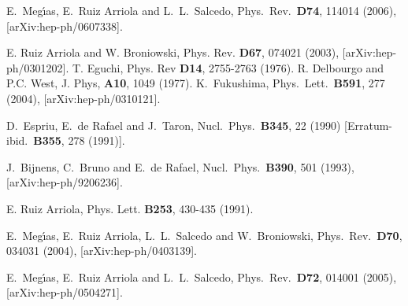 \begin{thebibliography}{10}

  E.~Meg\'{\i}as, E.~Ruiz Arriola and L.~L.~Salcedo,
  Phys.\ Rev.\  {\bf D74}, 114014 (2006),
  [arXiv:hep-ph/0607338].




E. Ruiz Arriola and W. Broniowski, Phys. Rev. {\bf D67}, 074021 (2003), [arXiv:hep-ph/0301202].
T. Eguchi, Phys. Rev {\bf D14}, 2755-2763 (1976).
R. Delbourgo and P.C. West, J. Phys, {\bf A10}, 1049 (1977).
  K.~Fukushima,
  Phys.\ Lett.\ {\bf B591}, 277 (2004),
  [arXiv:hep-ph/0310121].




  D.~Espriu, E.~de Rafael and J.~Taron,
  Nucl.\ Phys.\ {\bf B345}, 22 (1990)
  [Erratum-ibid.\ {\bf B355}, 278 (1991)].

  J.~Bijnens, C.~Bruno and E.~de Rafael,
  Nucl.\ Phys.\ {\bf B390}, 501 (1993),
  [arXiv:hep-ph/9206236].


E. Ruiz Arriola, Phys. Lett. {\bf B253}, 430-435 (1991).


  E.~Meg\'{\i}as, E.~Ruiz Arriola, L.~L.~Salcedo and W.~Broniowski,
  Phys.\ Rev.\ {\bf D70}, 034031 (2004),
  [arXiv:hep-ph/0403139].

  E.~Meg\'{\i}as, E.~Ruiz Arriola and L.~L.~Salcedo,
  Phys.\ Rev.\  {\bf D72}, 014001 (2005),
  [arXiv:hep-ph/0504271].


\end{thebibliography}
